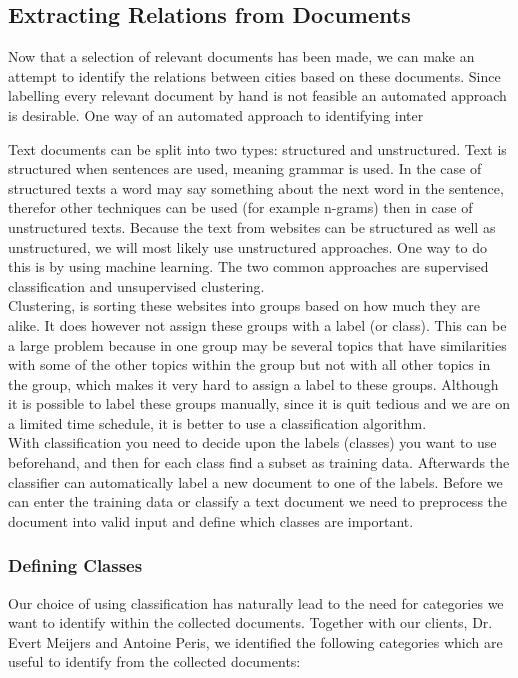 \subsection{Extracting Relations from Documents}
Now that a selection of relevant documents has been made, we can make an attempt to identify the relations between cities based on these documents. Since labelling every relevant document by hand is not feasible an automated approach is desirable. 
One way of an automated approach to identifying inter







Text documents can be split into two types: structured and unstructured. Text is structured when sentences are used, meaning grammar is used. In the case of structured texts a word may say something about the next word in the sentence, therefor other techniques can be used (for example n-grams) then in case of unstructured texts. Because the text from websites can be structured as well as unstructured, we will most likely use unstructured approaches. One way to do this is by using machine learning. The two common approaches are supervised classification and unsupervised clustering. \\

Clustering, is sorting these websites into groups based on how much they are alike. It does however not assign these groups with a label (or class). This can be a large problem because in one group may be several topics that have similarities with some of the other topics within the group but not with all other topics in the group, which makes it very hard to assign a label to these groups. Although it is possible to label these groups manually, since it is quit tedious and we are on a limited time schedule, it is better to use a classification algorithm. \\

With classification you need to decide upon the labels (classes) you want to use beforehand, and then for each class find a subset as training data. Afterwards the classifier can automatically label a new document to one of the labels. Before we can enter the training data or classify a text document we need to preprocess the document into valid input and define which classes are important.

\subsubsection{Defining Classes}
Our choice of using classification has naturally lead to the need for categories we want to identify within the collected documents. Together with our clients, Dr. Evert Meijers and Antoine Peris, we identified the following categories which are useful to identify from the collected documents:\\

